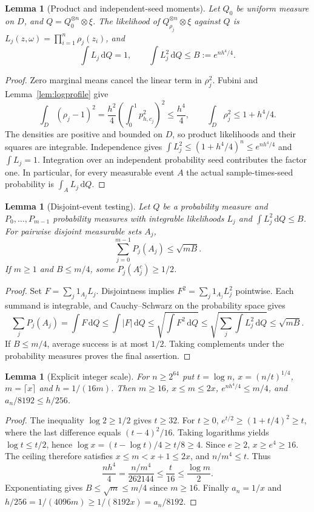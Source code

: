 \documentclass[11pt]{article}
\newtheorem{lemma}[theorem]{Lemma}
\theoremstyle{remark}
\newcommand{\dd}{\,\mathrm d}
\begin{document}
\begin{lemma}[Product and independent-seed moments]\label{lem:logmoment}
Let $Q_0$ be uniform measure on $D$, and $Q=Q_0^{\otimes n}\otimes\xi$.
The likelihood of $Q_{\rho_j}^{\otimes n}\otimes\xi$ against $Q$ is
$L_j(z,\omega)=\prod_{i=1}^n\rho_j(z_i)$, and
\begin{equation}\label{eq:logmoment}
 \int L_j\dd Q=1,\qquad
 \int L_j^2\dd Q\le B:=e^{nh^4/4}.
\end{equation}
\end{lemma}
\begin{proof}
Zero marginal means cancel the linear term in $\rho_j^2$.
Fubini and Lemma~\ref{lem:logprofile} give
\[
 \int_D(\rho_j-1)^2
 =\frac{h^2}{4}\left(\int_0^1p_{h,c_j}^2\right)^2
 \le\frac{h^4}{4},\qquad \int_D\rho_j^2\le1+h^4/4.
\]
The densities are positive and bounded on $D$, so product likelihoods
and their squares are integrable. Independence gives
$\int L_j^2\le(1+h^4/4)^n\le e^{nh^4/4}$ and $\int L_j=1$.
Integration over an independent probability seed contributes the
factor one. In particular, for every measurable event $A$ the actual
sample-times-seed probability is $\int_A L_j\dd Q$.
\end{proof}

\begin{lemma}[Disjoint-event testing]\label{lem:manytesting}
Let $Q$ be a probability measure and $P_0,\ldots,P_{m-1}$ probability
measures with integrable likelihoods $L_j$ and $\int L_j^2\dd Q\le B$.
For pairwise disjoint measurable sets $A_j$,
\begin{equation}\label{eq:manytesting}
 \sum_{j=0}^{m-1}P_j(A_j)\le\sqrt{mB}.
\end{equation}
If $m\ge1$ and $B\le m/4$, some $P_j(A_j^c)\ge1/2$.
\end{lemma}
\begin{proof}
Set $F=\sum_j1_{A_j}L_j$. Disjointness implies
$F^2=\sum_j1_{A_j}L_j^2$ pointwise. Each summand is integrable,
and Cauchy--Schwarz on the probability space gives
\[
 \sum_jP_j(A_j)=\int F\dd Q
 \le\int|F|\dd Q\le\sqrt{\int F^2\dd Q}
 \le\sqrt{\sum_j\int L_j^2\dd Q}\le\sqrt{mB}.
\]
If $B\le m/4$, average success is at most $1/2$. Taking complements
under the probability measures proves the final assertion.
\end{proof}

\begin{lemma}[Explicit integer scale]\label{lem:logscale}
For $n\ge2^{64}$ put $t=\log n$, $x=(n/t)^{1/4}$, $m=\lceil x\rceil$
and $h=1/(16m)$. Then $m\ge16$, $x\le m\le2x$,
$e^{nh^4/4}\le m/4$, and $a_n/8192\le h/256$.
\end{lemma}
\begin{proof}
The inequality $\log2\ge1/2$ gives $t\ge32$.
For $t\ge0$, $e^{t/2}\ge(1+t/4)^2\ge t$, where the last
difference equals $(t-4)^2/16$. Taking logarithms yields
$\log t\le t/2$, hence
$\log x=(t-\log t)/4\ge t/8\ge4$.
Since $e\ge2$, $x\ge e^4\ge16$. The ceiling therefore satisfies
$x\le m<x+1\le2x$, and $n/m^4\le t$. Thus
\[
 \frac{nh^4}{4}=\frac{n/m^4}{262144}
 \le\frac t{16}\le\frac{\log m}{2}.
\]
Exponentiating gives $B\le\sqrt m\le m/4$ since $m\ge16$.
Finally $a_n=1/x$ and
$h/256=1/(4096m)\ge1/(8192x)=a_n/8192$.
\end{proof}
\end{document}
